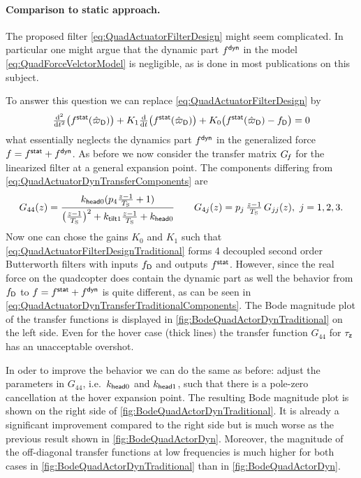 \paragraph{Comparison to static approach.}
The proposed filter \eqref{eq:QuadActuatorFilterDesign} might seem complicated.
In particular one might argue that the dynamic part $f^{\mathsf{dyn}}$ in the model \eqref{eq:QuadForceVelctorModel} is negligible, as is done in most publications on this subject.

To answer this question we can replace \eqref{eq:QuadActuatorFilterDesign} by
\begin{align}\label{eq:QuadActuatorFilterDesignTraditional}
 \tfrac{\mathrm{d}^2}{\mathrm{d} t^2} \big(f^{\mathsf{stat}}(\hat{\varpi}_{\mathsf{D}})\big) + K_1 \tfrac{\mathrm{d}}{\mathrm{d} t} \big(f^{\mathsf{stat}}(\hat{\varpi}_{\mathsf{D}})\big) + K_0 \big( f^{\mathsf{stat}}(\hat{\varpi}_{\mathsf{D}}) - f_{\mathsf{D}} \big) = 0
\end{align}
what essentially neglects the dynamics part $f^{\mathsf{dyn}}$ in the generalized force $f = f^{\mathsf{stat}} + f^{\mathsf{dyn}}$.
As before we now consider the transfer matrix $G_{\hspace{-0.3ex}f}$ for the linearized filter at a general expansion point.
The components differing from \eqref{eq:QuadActuatorDynTransferComponents} are
\begin{align}\label{eq:QuadActuatorDynTransferTraditionalComponents}
 G_{44}(z) = \frac{k_{\mathsf{head}0}(p_4\tfrac{z-1}{T_{\mathrm{S}}} + 1)}{\big(\tfrac{z-1}{T_{\mathrm{S}}}\big)^2 + k_{\mathsf{tilt}1} \tfrac{z-1}{T_{\mathrm{S}}} + k_{\mathsf{head}0}}
\qquad
 G_{4j}(z) = p_j\,\tfrac{z-1}{T_{\mathrm{S}}}\,G_{jj}(z), \ j=1,2,3.
\end{align}
Now one can chose the gains $K_0$ and $K_1$ such that \eqref{eq:QuadActuatorFilterDesignTraditional} forms 4 decoupled second order Butterworth filters with inputs $f_{\mathsf{D}}$ and outputs $f^{\mathsf{stat}}$.
However, since the real force on the quadcopter does contain the dynamic part as well the behavior from $f_{\mathsf{D}}$ to $f = f^{\mathsf{stat}} + f^{\mathsf{dyn}}$ is quite different, as can be seen in \eqref{eq:QuadActuatorDynTransferTraditionalComponents}.
The Bode magnitude plot of the transfer functions is displayed in \autoref{fig:BodeQuadActorDynTraditional} on the left side.
Even for the hover case (thick lines) the transfer function $G_{44}$ for $\tau_{\mathsf{z}}$ has an unacceptable overshot.

In oder to improve the behavior we can do the same as before: adjust the parameters in $G_{44}$, i.e.\ $k_{\mathsf{head}0}$ and $k_{\mathsf{head}1}$, such that there is a pole-zero cancellation at the hover expansion point.
The resulting Bode magnitude plot is shown on the right side of \autoref{fig:BodeQuadActorDynTraditional}.
It is already a significant improvement compared to the right side but is much worse as the previous result shown in \autoref{fig:BodeQuadActorDyn}.
Moreover, the magnitude of the off-diagonal transfer functions at low frequencies is much higher for both cases in \autoref{fig:BodeQuadActorDynTraditional} than in \autoref{fig:BodeQuadActorDyn}.

